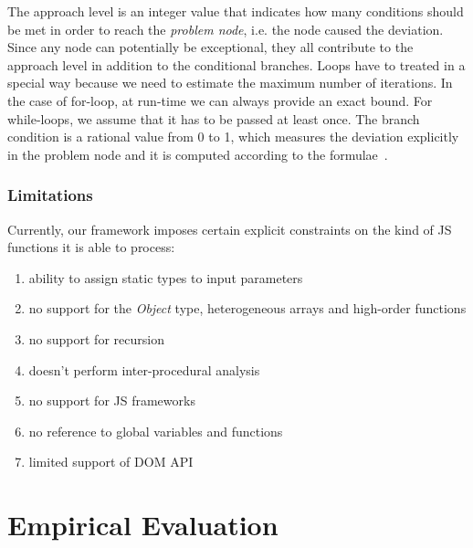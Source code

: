 \documentclass[sigconf,review,anonymous]{acmart}
\begin{document}
The approach level is an integer value that indicates how many conditions should be met in order to reach the \emph{problem node}, i.e. the node caused the deviation. Since any node can potentially be exceptional, they all contribute to the approach level in addition to the conditional branches. Loops have to treated in a special way because we need to estimate the maximum number of iterations. In the case of for-loop, at run-time we can always provide an exact bound. For while-loops, we assume that it has to be passed at least once. The branch condition is a rational value from 0 to 1, which measures the deviation explicitly in the problem node and it is computed according to the formulae~\cite{tracey1998automated}.
 
\subsubsection{Limitations}
\label{sub.sub.sec.limit}

Currently, our framework imposes certain explicit constraints on the kind of JS functions it is able to process: 
\begin{enumerate}
\item ability to assign static types to input parameters 
\item no support for the \emph{Object} type, heterogeneous arrays and high-order functions
\item no support for recursion
\item doesn't perform inter-procedural analysis
\item no support for JS frameworks
\item no reference to global variables and functions
\item limited support of DOM API     
\end{enumerate}

\section{Empirical Evaluation}
\label{sec.evaluation}
\end{document}
